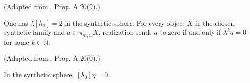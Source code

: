 \begin{theorem}
\label{frontier:Literature:e10e68418839}
(Adapted from \cite{BHS}, Prop. A.20(9).)\par{}

One has $\lambda[h_0]=2$ in the synthetic sphere. For every object $X$ in the chosen synthetic family and $a\in\pi_{m,w}X$, realization sends $a$ to zero if and only if $\lambda^k a=0$ for some $k\in\mathbb N$.

(Adapted from \cite{BHS}, Prop. A.20(0).)\par{}

In the synthetic sphere, $[h_0]\eta=0$.

\end{theorem}
